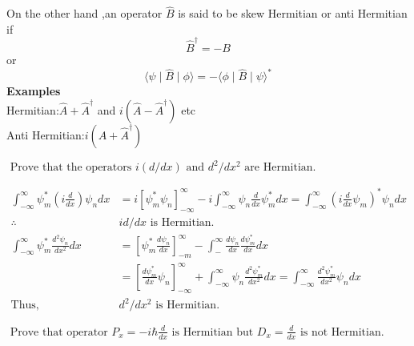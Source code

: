 On the other hand ,an operator $\hat{B}$ is said to be skew Hermitian or anti Hermitian if \\
$$ \hat{B}^{\dagger}=-B $$
or $$ \langle \psi \mid \hat{B} \mid \phi \rangle =-\langle \phi \mid \hat{B} \mid \psi\rangle ^*$$
\textbf{Examples}\\
Hermitian:$\hat{A}+\hat{A}^{\dagger}$ and $i(\hat{A}-\hat{A}^{\dagger})$ etc\\
Anti Hermitian:$i(\hat{A}+\hat{A}^{\dagger})$
\begin{exercise}
	$\text { Prove that the operators } i(d / d x) \text { and } d^{2} / d x^{2} \text { are Hermitian. }$
\end{exercise}
\begin{answer}
	\begin{align*}
	\int_{-\infty}^{\infty} \psi_{m}^{*}\left(i \frac{d}{d x}\right) \psi_{n} d x&=i\left[\psi_{m}^{*} \psi_{n}\right]_{-\infty}^{\infty}-i \int_{-\infty}^{\infty} \psi_{n} \frac{d}{d x} \psi_{m}^{*} d x=\int_{-\infty}^{\infty}\left(i \frac{d}{d x} \psi_{m}\right)^{*} \psi_{n} d x\\
	\therefore \quad &i d / d x\text{ is Hermitian.}\\
	\int_{-\infty}^{\infty} \psi_{m}^{*} \frac{d^{2} \psi_{n}}{d x^{2}} d x&=\left[\psi_{m}^{*} \frac{d \psi_{n}}{d x}\right]_{-m}^{\infty}-\int_{-}^{\infty} \frac{d \psi_{n}}{d x} \frac{d \psi_{m}^{*}}{d x} d x\\
	&=\left[\frac{d \psi_{m}^{*}}{d x} \psi_{n}\right]_{-\infty}^{\infty}+\int_{-\infty}^{\infty} \psi_{n} \frac{d^{2} \psi_{m}^{*}}{d x^{2}} d x=\int_{-\infty}^{\infty} \frac{d^{2} \psi_{m}^{*}}{d x^{2}} \psi_{n} d x\\
	\text{Thus, }&d^{2} / d x^{2}\text{ is Hermitian.	}
	\end{align*}	
\end{answer}
\begin{exercise}
$\text { Prove that operator } P_{x}=-i \hbar \frac{d}{d x} \text { is Hermitian but } D_{x}=\frac{d}{d x} \text { is not Hermitian. }$
\end{exercise}
